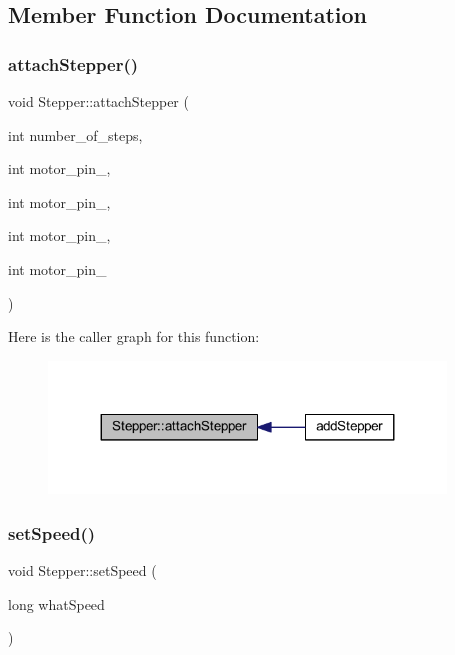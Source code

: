 \subsection{Member Function Documentation}
\mbox{\label{class_stepper_a3f68ee9b26d4076133ebfe070ec0b37c}} 
\subsubsection{\texorpdfstring{attach\+Stepper()}{attachStepper()}}
{\footnotesize\ttfamily void Stepper\+::attach\+Stepper (\begin{DoxyParamCaption}\item[{int}]{number\+\_\+of\+\_\+steps,  }\item[{int}]{motor\+\_\+pin\+\_,  }\item[{int}]{motor\+\_\+pin\+\_,  }\item[{int}]{motor\+\_\+pin\+\_,  }\item[{int}]{motor\+\_\+pin\+\_ }\end{DoxyParamCaption})}

Here is the caller graph for this function\+:
\nopagebreak
\begin{figure}[H]
\begin{center}
\leavevmode
\includegraphics[width=299pt]{dc/db2/class_stepper_a3f68ee9b26d4076133ebfe070ec0b37c_icgraph}
\end{center}
\end{figure}
\mbox{\label{class_stepper_a89a1f8b30656437bba8732721d5671e2}} 
\subsubsection{\texorpdfstring{set\+Speed()}{setSpeed()}}
{\footnotesize\ttfamily void Stepper\+::set\+Speed (\begin{DoxyParamCaption}\item[{long}]{what\+Speed }\end{DoxyParamCaption})}

